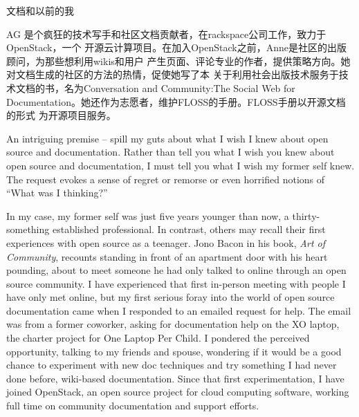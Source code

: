 {文档和以前的我}

{
AG 是个疯狂的技术写手和社区文档贡献者，在rackspace公司工作，致力于OpenStack，一个
开源云计算项目。在加入OpenStack之前，Anne是社区的出版顾问，为那些想利用wikis和用户
产生页面、评论专业的作者，提供策略方向。她对文档生成的社区的方法的热情，促使她写了本
关于利用社会出版技术服务于技术文档的书，名为Conversation and Community:The Social
 Web for Documentation。她还作为志愿者，维护FLOSS的手册。FLOSS手册以开源文档的形式
为开源项目服务。
}

\noindent{}An intriguing premise -- spill my guts about what I wish I knew about open
source and documentation. Rather than tell you what I wish you knew about open
source and documentation, I must tell you what I wish my former self knew. The
request evokes a sense of regret or remorse or even horrified notions of ``What
was I thinking?'' 

In my case, my former self was just five years younger than now, a
thirty-something established professional. In contrast, others may recall their
first experiences with open source as a teenager. Jono Bacon in his book,
\textit{Art of Community}, recounts standing in front of an apartment door with
his heart pounding, about to meet someone he had only talked to online through
an open source community. I have experienced that first in-person meeting with
people I have only met online, but my first serious foray into the world of open
source documentation came when I responded to an emailed request for help. The
email was from a former coworker, asking for documentation help on the XO
laptop, the charter project for One Laptop Per Child. I pondered the perceived
opportunity, talking to my friends and spouse, wondering if it would be a good
chance to experiment with new doc techniques and try something I had never done
before, wiki-based documentation. Since that first experimentation, I have joined
OpenStack, an open source project for cloud computing software, working full
time on community documentation and support efforts. 

